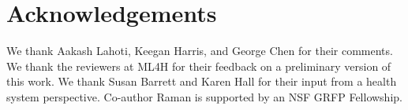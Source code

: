 \section*{Acknowledgements}
We thank Aakash Lahoti, Keegan Harris, and George Chen for their comments. We thank the reviewers at ML4H for their feedback on a preliminary version of this work. We thank Susan Barrett and Karen Hall for their input from a health system perspective. Co-author Raman is supported by an NSF GRFP Fellowship.